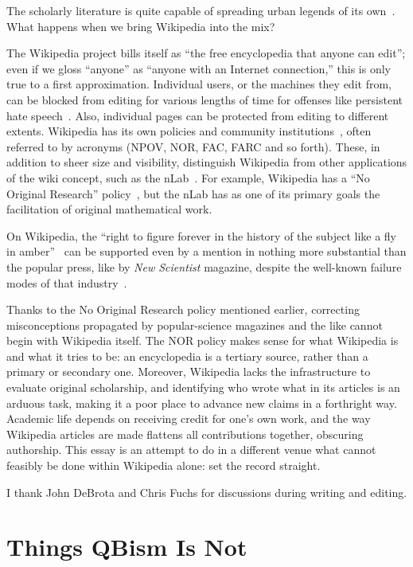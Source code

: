 \documentclass[aps,pra,superscriptaddress,12pt,tightenlines,nofootinbib]{revtex4}
\newcommand{\booktitle}{\textsl}
\begin{document}
The scholarly literature is quite capable of spreading urban legends
of its own~\cite{Rekdal2014}.  What happens when we bring
Wikipedia into the mix?

The Wikipedia project bills itself as ``the free encyclopedia that
anyone can edit''; even if we gloss ``anyone'' as ``anyone with an
Internet connection,'' this is only true to a first approximation.
Individual users, or the machines they edit from, can be blocked from
editing for various lengths of time for offenses like persistent hate
speech~\cite{Ferguson2014}.  Also, individual pages can be protected
from editing to different extents.  Wikipedia has its own policies and
community institutions~\cite{Paling2015}, often referred to by
acronyms (NPOV, NOR, FAC, FARC and so forth).  These, in addition to
sheer size and visibility, distinguish Wikipedia from other
applications of the wiki concept, such as the nLab~\cite{nLab}.  For
example, Wikipedia has a ``No Original Research'' policy~\cite{WPNOR},
but the nLab has as one of its primary goals the facilitation of
original mathematical work.

On Wikipedia, the ``right to figure forever in the history of the
subject like a fly in amber''~\cite{James1909} can be supported even
by a mention in nothing more substantial than the popular press, like
by \booktitle{New Scientist} magazine, despite the well-known failure
modes of that industry~\cite[p.\ 2221]{Fuchs2014}.

Thanks to the No Original Research policy mentioned earlier,
correcting misconceptions propagated by popular-science magazines and
the like cannot begin with Wikipedia itself.  The NOR policy makes
sense for what Wikipedia is and what it tries to be: an encyclopedia
is a tertiary source, rather than a primary or secondary one.
Moreover, Wikipedia lacks the infrastructure to evaluate original
scholarship, and identifying who wrote what in its articles is an
arduous task, making it a poor place to advance new claims in a
forthright way.  Academic life depends on receiving credit for one's
own work, and the way Wikipedia articles are made flattens all
contributions together, obscuring authorship.  This essay is an
attempt to do in a different venue what cannot feasibly be done within
Wikipedia alone: set the record straight.

\bigskip

I thank John DeBrota and Chris Fuchs for discussions during writing
and editing.

\appendix
\section{Things QBism Is Not}
\end{document}

